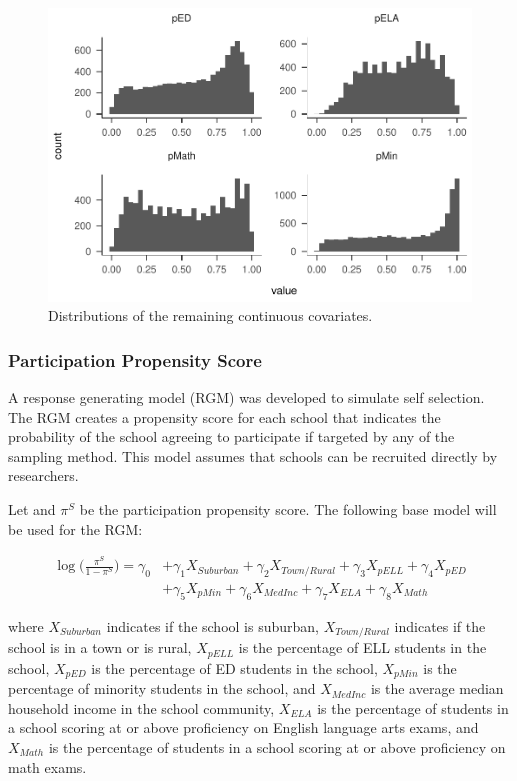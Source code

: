 \documentclass[man,floatsintext]{apa6}
\theoremstyle{definition}
\theoremstyle{definition}
\theoremstyle{definition}
\theoremstyle{remark}
\begin{document}
\begin{figure}
\centering
\includegraphics{GenSamp_Paper_files/figure-latex/plot-dist2-1.pdf}
\caption{\label{fig:plot-dist2}Distributions of the remaining continuous
covariates.}
\end{figure}

\hypertarget{participation-propensity-score}{%
\subsubsection{Participation Propensity
Score}\label{participation-propensity-score}}

A response generating model (RGM) was developed to simulate self
selection. The RGM creates a propensity score for each school that
indicates the probability of the school agreeing to participate if
targeted by any of the sampling method. This model assumes that schools
can be recruited directly by researchers.

Let and \(\pi^S\) be the participation propensity score. The following
base model will be used for the RGM:

\begin{align} \label{eq:sRGM}
  \log\bigg(\frac{\pi^S}{1-\pi^S}\bigg) = \gamma_{0} &+ \gamma_{1}X_{Suburban} + \gamma_{2}X_{Town/Rural} + \gamma_{3}X_{pELL} + \gamma_{4}X_{pED} 
  \\
  &+ \gamma_{5}X_{pMin} + \gamma_{6}X_{MedInc} + \gamma_{7}X_{ELA} + \gamma_{8}X_{Math} \nonumber
\end{align}

where \(X_{Suburban}\) indicates if the school is suburban,
\(X_{Town/Rural}\) indicates if the school is in a town or is rural,
\(X_{pELL}\) is the percentage of ELL students in the school,
\(X_{pED}\) is the percentage of ED students in the school, \(X_{pMin}\)
is the percentage of minority students in the school, and \(X_{MedInc}\)
is the average median household income in the school community,
\(X_{ELA}\) is the percentage of students in a school scoring at or
above proficiency on English language arts exams, and \(X_{Math}\) is
the percentage of students in a school scoring at or above proficiency
on math exams.
\end{document}
